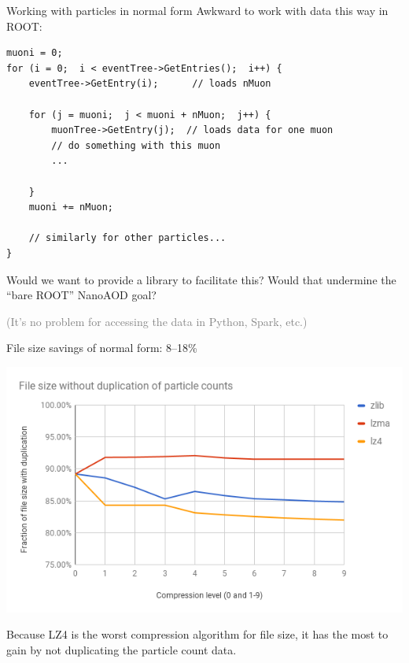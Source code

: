\documentclass{beamer}
\begin{document}
\begin{frame}[fragile]{Working with particles in normal form}
\vspace{0.5 cm}
Awkward to work with data this way in ROOT:

\vspace{0.25 cm}
\scriptsize
\begin{verbatim}
muoni = 0;
for (i = 0;  i < eventTree->GetEntries();  i++) {
    eventTree->GetEntry(i);      // loads nMuon

    for (j = muoni;  j < muoni + nMuon;  j++) {
        muonTree->GetEntry(j);  // loads data for one muon
        // do something with this muon
        ...

    }
    muoni += nMuon;

    // similarly for other particles...
}
\end{verbatim}

\vspace{0.25 cm}
\normalsize
Would we want to provide a library to facilitate this? Would that undermine the ``bare ROOT'' NanoAOD goal?

\vspace{0.25 cm}
\textcolor{gray}{(It's no problem for accessing the data in Python, Spark, etc.)}
\end{frame}

\begin{frame}{File size savings of normal form: 8--18\%}
\begin{center}
\includegraphics[width=\linewidth]{avoiding-duplication.png}
\end{center}

Because LZ4 is the worst compression algorithm for file size, it has the most to gain by not duplicating the particle count data.
\end{frame}
\end{document}
